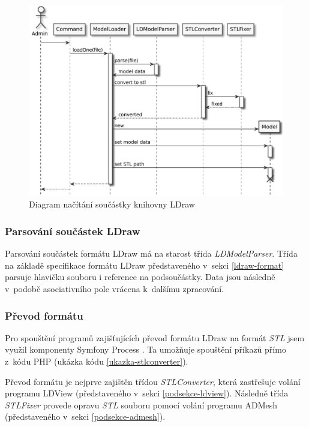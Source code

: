 \begin{figure}[htbp]
    \centering
    \includegraphics[width=\textwidth,height=\textheight,keepaspectratio]{pdfs/loading.pdf}
    \caption{Diagram načítání součástky knihovny LDraw \label{schema-nacitani}}
\end{figure}

\subsubsection*{Parsování součástek LDraw}
Parsování součástek formátu LDraw má na starost třída \textit{LDModelParser}. Třída na základě specifikace formátu LDraw představeného v~sekci \ref{ldraw-format} parsuje hlavičku souboru i reference na podsoučástky. Data jsou následně v~podobě asociativního pole vrácena k~dalšímu zpracování.

\subsubsection*{Převod formátu}
Pro spouštění programů zajišťujících převod formátu LDraw na formát \textit{\gls{STL}} jsem využil komponenty Symfony Process \autocite{symfony:process}. Ta umožňuje spouštění příkazů přímo z~kódu PHP (ukázka kódu \ref{ukazka-stlconverter}).

Převod formátu je nejprve zajištěn třídou \textit{STLConverter}, která zastřešuje volání programu LDView (představeného v~sekci \ref{podsekce-ldview}). Následně třída \textit{STLFixer} provede opravu \textit{\gls{STL}} souboru pomocí volání programu ADMesh (představeného v~sekci \ref{podsekce-admesh}).


